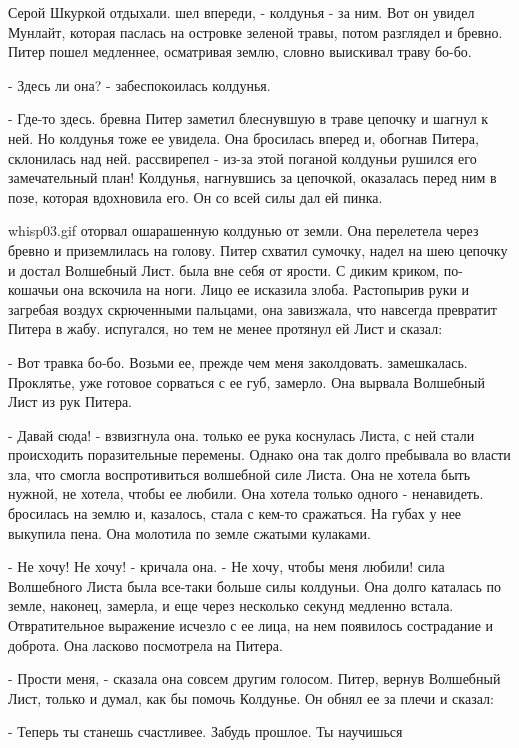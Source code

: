Серой Шкуркой отдыхали.
 шел впереди, - колдунья - за ним. Вот он увидел Мунлайт, 
которая паслась на островке зеленой травы, потом разглядел и бревно. 
Питер пошел медленнее, осматривая землю, словно выискивал траву бо-бо.
\par- Здесь ли она? - забеспокоилась колдунья.
\par- Где-то здесь.
 бревна Питер заметил блеснувшую в траве цепочку и шагнул к 
ней. Но колдунья тоже ее увидела. Она бросилась вперед и, обогнав 
Питера, склонилась над ней.
 рассвирепел - из-за этой поганой колдуньи рушился его 
замечательный план! Колдунья, нагнувшись за цепочкой, оказалась перед 
ним в позе, которая вдохновила его. Он со всей силы дал ей пинка.
\par{whisp03.gif}
 оторвал ошарашенную колдунью от земли. Она перелетела через 
бревно и приземлилась на голову. Питер схватил сумочку, надел на шею 
цепочку и достал Волшебный Лист.
 была вне себя от ярости. С диким криком, по-кошачьи она 
вскочила на ноги. Лицо ее исказила злоба. Растопырив руки и загребая 
воздух скрюченными пальцами, она завизжала, что навсегда превратит 
Питера в жабу.
 испугался, но тем не менее протянул ей Лист и сказал:
\par- Вот травка бо-бо. Возьми ее, прежде чем меня заколдовать.
 замешкалась. Проклятье, уже готовое сорваться с ее губ, 
замерло. Она вырвала Волшебный Лист из рук Питера.
\par- Давай сюда! - взвизгнула она.
 только ее рука коснулась Листа, с ней стали происходить 
поразительные перемены. Однако она так долго пребывала во власти зла, 
что смогла воспротивиться волшебной силе Листа. Она не хотела быть 
нужной, не хотела, чтобы ее любили. Она хотела только одного - 
ненавидеть.
 бросилась на землю и, казалось, стала с кем-то сражаться. 
На губах у нее выкупила пена. Она молотила по земле сжатыми кулаками.
\par- Не хочу! Не хочу! - кричала она. - Не хочу, чтобы меня любили!
 сила Волшебного Листа была все-таки больше силы колдуньи. Она 
долго каталась по земле, наконец, замерла, и еще через несколько 
секунд медленно встала. Отвратительное выражение исчезло с ее лица, на 
нем появилось сострадание и доброта. Она ласково посмотрела на Питера.
\par- Прости меня, - сказала она совсем другим голосом.
 Питер, вернув Волшебный Лист, только и думал, как бы помочь 
Колдунье. Он обнял ее за плечи и сказал:
\par- Теперь ты станешь счастливее. Забудь прошлое. Ты научишься 
